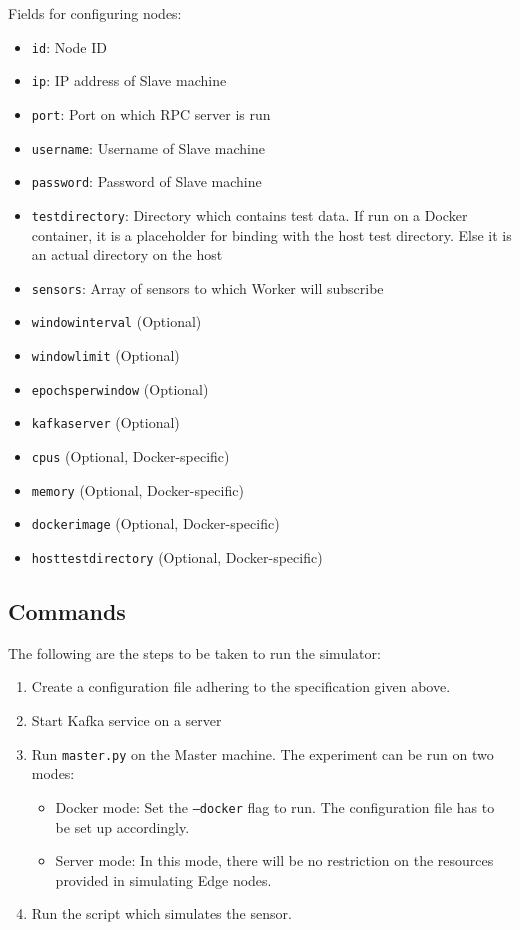 \documentclass[a4paper, 12pt]{article}
\begin{document}
Fields for configuring nodes:
\begin{itemize}
    \item \texttt{id}: Node ID
    \item \texttt{ip}: IP address of Slave machine
    \item \texttt{port}: Port on which RPC server is run
    \item \texttt{username}: Username of Slave machine
    \item \texttt{password}: Password of Slave machine
    \item \texttt{test\textunderscore directory}: Directory which contains test data. If run on a Docker container, it is a placeholder for binding with the host test directory. Else it is an actual directory on the host
    \item \texttt{sensors}: Array of sensors to which Worker will subscribe
    \item \texttt{window\textunderscore interval} (Optional)
    \item \texttt{window\textunderscore limit} (Optional)
    \item \texttt{epochs\textunderscore per\textunderscore window} (Optional)
    \item \texttt{kafka\textunderscore server} (Optional)
    \item \texttt{cpus} (Optional, Docker-specific)
    \item \texttt{memory} (Optional, Docker-specific)
    \item \texttt{docker\textunderscore image} (Optional, Docker-specific)
    \item \texttt{host\textunderscore test\textunderscore directory} (Optional, Docker-specific)
\end{itemize}

\subsection{Commands}

The following are the steps to be taken to run the simulator:
\begin{enumerate}
    \item Create a configuration file adhering to the specification given above.
    \item Start Kafka service on a server
    \item Run \texttt{master.py} on the Master machine. The experiment can be run on two modes:
    \begin{itemize}
        \item Docker mode: Set the \texttt{--docker} flag to run. The configuration file has to be set up accordingly.  
        \item Server mode: In this mode, there will be no restriction on the resources provided in simulating Edge nodes. 
    \end{itemize}
    \item Run the script which simulates the sensor.
\end{enumerate}
\end{document}

